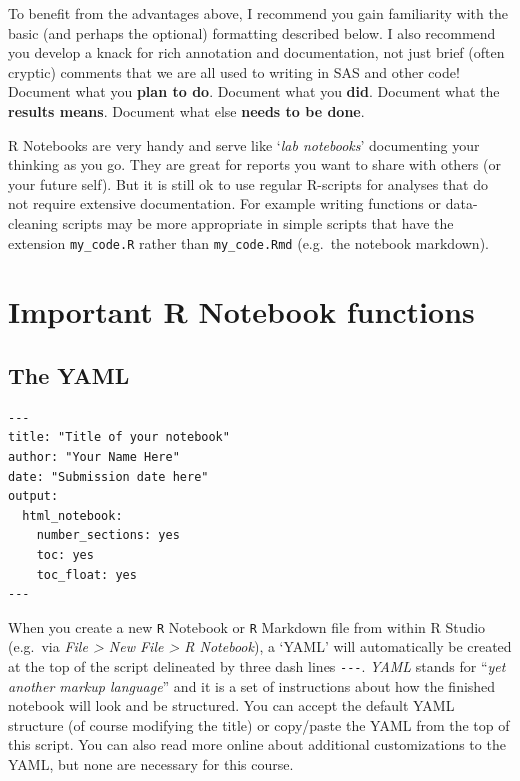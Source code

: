 \documentclass[
]{book}
\newenvironment{rmdtip}[1]
  {
  \begin{itemize}
  \renewcommand{\labelitemi}{
    \raisebox{-.7\height}[0pt][0pt]{
      {\setkeys{Gin}{width=3em,keepaspectratio}\texttt{[image: images/\#1]}}
    }
  }
  \setlength{\fboxsep}{1em}
  \begin{tip}
  \item
  }
  {
  \end{tip}
  \end{itemize}
  }
\begin{document}
To benefit from the advantages above, I recommend you gain familiarity with the basic (and perhaps the optional) formatting described below. I also recommend you develop a knack for rich annotation and documentation, not just brief (often cryptic) comments that we are all used to writing in SAS and other code! Document what you \textbf{plan to do}. Document what you \textbf{did}. Document what the \textbf{results means}. Document what else \textbf{needs to be done}.

\begin{rmdtip}{tip}
R Notebooks are very handy and serve like `\emph{lab notebooks}' documenting your thinking as you go. They are great for reports you want to share with others (or your future self). But it is still ok to use regular R-scripts for analyses that do not require extensive documentation. For example writing functions or data-cleaning scripts may be more appropriate in simple scripts that have the extension \texttt{my\_code.R} rather than \texttt{my\_code.Rmd} (e.g.~the notebook markdown).

\end{rmdtip}

\hypertarget{important-r-notebook-functions}{%
\section{Important R Notebook functions}\label{important-r-notebook-functions}}

\hypertarget{the-yaml}{%
\subsection{The YAML}\label{the-yaml}}

\begin{verbatim}
---
title: "Title of your notebook"
author: "Your Name Here"
date: "Submission date here"
output:
  html_notebook:
    number_sections: yes
    toc: yes
    toc_float: yes
---
\end{verbatim}

When you create a new \texttt{R} Notebook or \texttt{R} Markdown file from within R Studio (e.g.~via \emph{File \textgreater{} New File \textgreater{} R Notebook}), a `YAML' will automatically be created at the top of the script delineated by three dash lines \texttt{-\/-\/-}. \emph{YAML} stands for ``\emph{yet another markup language}'' and it is a set of instructions about how the finished notebook will look and be structured. You can accept the default YAML structure (of course modifying the title) or copy/paste the YAML from the top of this script. You can also read more online about additional customizations to the YAML, but none are necessary for this course.
\end{document}
